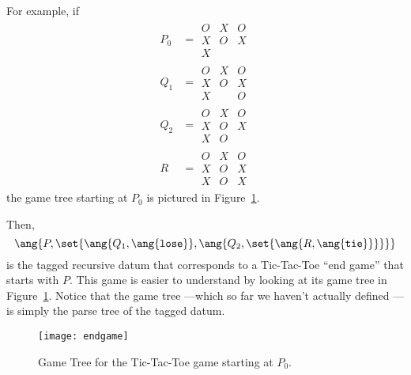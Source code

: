 \begin{definition}
For example, if
\begin{align*}
P_0 & =  \begin{array}{c|c|c}
                O & X & O\\
         \hline X & O & X\\
         \hline X & &
        \end{array}\\
Q_1 & = \begin{array}{c|c|c}
                O & X & O\\
         \hline X & O & X\\
         \hline X &  & O
        \end{array}\\
Q_2 & = \begin{array}{c|c|c}
                O & X & O\\
         \hline X & O & X\\
         \hline X & O & 
        \end{array}\\
R & = \begin{array}{c|c|c}
                O & X & O\\
         \hline X & O & X\\
         \hline X & O & X
        \end{array}
\end{align*}
the game tree starting at $P_0$ is pictured in Figure~\ref{fig:endgame}.

\begin{staffnotes}

Then,
\begin{equation}\label{endgame}
\ang{P, \set{\ang{Q_1, \ang{\texttt{lose}}},
             \ang{Q_2, \set{\ang{R,\ang{\texttt{tie}}}}}}}
\end{equation}
is the tagged recursive datum that corresponds to a Tic-Tac-Toe ``end
game'' that starts with $P$.  This game is easier to understand by looking
at its game tree in Figure~\ref{fig:endgame}.  Notice that the game tree
---which so far we haven't actually defined ---is simply the parse tree of
the tagged datum.

\end{staffnotes}

\begin{figure}[htbp]
\texttt{[image: endgame]}
\caption{Game Tree for the Tic-Tac-Toe game starting at $P_0$.}
\label{fig:endgame}
\end{figure}


\end{definition}
